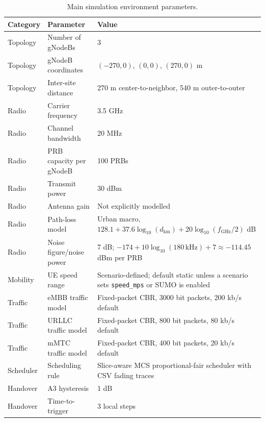 
\begin{table}[htbp]
\centering
\caption{Main simulation environment parameters.}
\label{tab:main_simulation_environment_parameters}
\begin{tabular}{lll}
\toprule
\textbf{Category} & \textbf{Parameter} & \textbf{Value} \\
\midrule
Topology & Number of gNodeBs & 3 \\
Topology & gNodeB coordinates & $(-270,0)$, $(0,0)$, $(270,0)$ m \\
Topology & Inter-site distance & 270 m center-to-neighbor, 540 m outer-to-outer \\
Radio & Carrier frequency & 3.5 GHz \\
Radio & Channel bandwidth & 20 MHz \\
Radio & PRB capacity per gNodeB & 100 PRBs \\
Radio & Transmit power & 30 dBm \\
Radio & Antenna gain & Not explicitly modelled \\
Radio & Path-loss model & Urban macro, $128.1+37.6\log_{10}(d_{\mathrm{km}})+20\log_{10}(f_{\mathrm{GHz}}/2)$ dB \\
Radio & Noise figure/noise power & 7 dB; $-174+10\log_{10}(180\,\mathrm{kHz})+7 \approx -114.45$ dBm per PRB \\
Mobility & UE speed range & Scenario-defined; default static unless a scenario sets \texttt{speed\_mps} or SUMO is enabled \\
Traffic & eMBB traffic model & Fixed-packet CBR, 3000 bit packets, 200 kb/s default \\
Traffic & URLLC traffic model & Fixed-packet CBR, 800 bit packets, 80 kb/s default \\
Traffic & mMTC traffic model & Fixed-packet CBR, 400 bit packets, 20 kb/s default \\
Scheduler & Scheduling rule & Slice-aware MCS proportional-fair scheduler with CSV fading traces \\
Handover & A3 hysteresis & 1 dB \\
Handover & Time-to-trigger & 3 local steps \\

\end{tabular}
\end{table}
